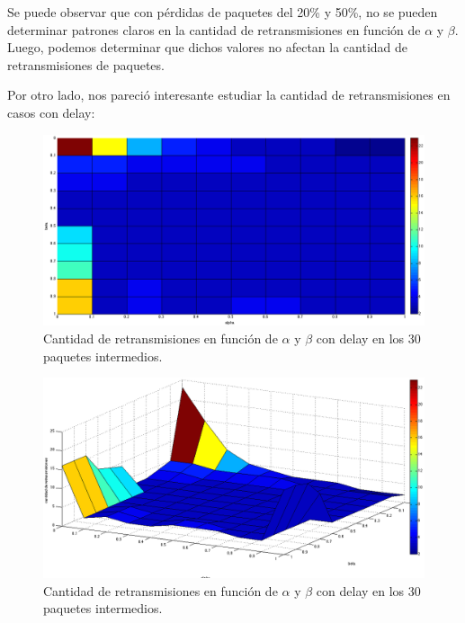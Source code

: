 \documentclass[10pt, a4paper]{article}
\begin{document}
Se puede observar que con pérdidas de paquetes del 20\% y 50\%, no se pueden determinar patrones claros en la cantidad de retransmisiones en función de $\alpha$ y $\beta$. Luego, podemos determinar que dichos valores no afectan la cantidad de retransmisiones de paquetes.

Por otro lado, nos pareció interesante estudiar la cantidad de retransmisiones en casos con delay:

\begin{figure}[H]
\begin{center}
\includegraphics[width=17cm]{delay-30F30L-ret.png}
\caption{Cantidad de retransmisiones en función de $\alpha$ y $\beta$ con delay en los 30 paquetes intermedios.}
\end{center}
\end{figure}

\begin{figure}[H]
\begin{center}
\includegraphics[width=17cm]{delay-30F30L-ret-costado.png}
\caption{Cantidad de retransmisiones en función de $\alpha$ y $\beta$ con delay en los 30 paquetes intermedios.}
\end{center}
\end{figure}
\end{document}
